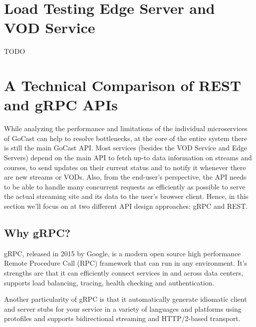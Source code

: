

\section{Load Testing Edge Server and VOD Service}

TODO

\section{A Technical Comparison of REST and gRPC APIs}

While analyzing the performance and limitations of the individual microservices of GoCast can help to resolve bottlenecks, at the core of the entire system there is still the main GoCast \ac{API}.
Most services (besides the VOD Service and Edge Servers) depend on the main \ac{API} to fetch up-to data information on streams and courses, to send updates on their current status and to notify it whenever there are new streams or \ac{VOD}s. Also, from the end-user's perspective, the API needs to be able to handle many concurrent requests as efficiently as possible to serve the actual streaming site and its data to the user's browser client.
Hence, in this section we'll focus on at two different \ac{API} design approaches: gRPC and REST.

\subsection{Why gRPC?}

gRPC, released in 2015 by Google, is a modern open source high performance Remote Procedure Call (RPC) framework that can run in any environment. It's strengths are that it can efficiently connect services in and across data centers, supports load balancing, tracing, health checking and authentication.

Another particularity of gRPC is that it automatically generate idiomatic client and server stubs for your service in a variety of languages and platforms using protofiles and supports bidirectional streaming and HTTP/2-based transport.
~\parencite{grpc_vs_rest}

